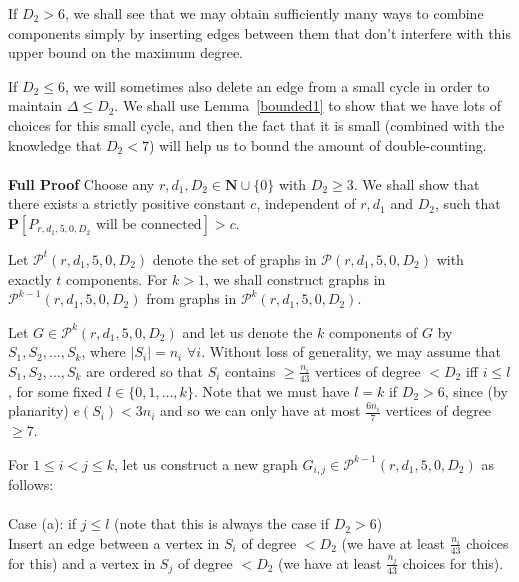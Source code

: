\documentclass{article}
\newtheorem{Proof of Theorem}{Proof of Theorem}
\begin{document}
If $D_{2} > 6$,
we shall see that we may obtain sufficiently many ways to combine components
simply by inserting edges between them that don't interfere with this upper bound on the maximum degree.


If $D_{2} \leq 6$,
we will sometimes also delete an edge from a small cycle
in order to maintain $\Delta \leq D_{2}$.
We shall use Lemma~\ref{bounded1} to show that
we have lots of choices for this small cycle,
and then the fact that it is small
(combined with the knowledge that $D_{2}<7$) 
will help us to bound the amount of double-counting. \\
\\
\textbf{Full Proof}
Choose any $r,d_{1},D_{2} \in \mathbf{N} \cup \{ 0 \}$ with $D_{2} \geq 3$.
We shall show that there exists a strictly positive constant $c$,
independent of $r,d_{1}$ and $D_{2}$,
such that
$\mathbf{P} [P_{r,d_{1},5,0,D_{2}} \textrm{ will be connected}] > c$.

Let $\mathcal{P}^{t}(r,d_{1},5,0,D_{2})$ denote the set of graphs in 
$\mathcal{P}(r,d_{1}, 5,0,D_{2})$ with exactly $t$ components.
For $k>1$, we shall construct graphs in $\mathcal{P}^{k-1}(r,d_{1},5,0,D_{2})$
from graphs in $\mathcal{P}^{k}(r,d_{1},5,0,D_{2})$.

Let $G \in \mathcal{P}^{k}(r,d_{1},5,0,D_{2})$
and let us denote the $k$ components of $G$ by $S_{1}, S_{2}, \ldots, S_{k}$,
where $|S_{i}|=n_{i}$ $\forall i$.
Without loss of generality,
we may assume that $S_{1}, S_{2}, \ldots, S_{k}$ are ordered so that 
$S_{i}$ contains $\geq \frac{n_{i}}{43}$ vertices of degree $<D_{2}$ iff $i \leq l$, 
for some fixed $l \in \{ 0,1, \ldots, k \}$.
Note that we must have $l=k$ if $D_{2} > 6$,
since (by planarity) $e(S_{i}) < 3n_{i}$
and so we can only have at most $\frac{6n_{i}}{7}$ vertices of degree~$\geq 7$.

For $1 \leq i < j \leq k$,
let us construct a new graph $G_{i,j} \in \mathcal{P}^{k-1}(r,d_{1},5,0,D_{2})$ as follows: \\
\\
Case (a): if $j \leq l$ (note that this is always the case if $D_{2} > 6$) \\
Insert an edge between a vertex in $S_{i}$ of degree $<D_{2}$
(we have at least $\frac{n_{i}}{43}$ choices for this)
and a vertex in $S_{j}$ of degree $<D_{2}$
(we have at least $\frac{n_{j}}{43}$ choices for this). 
\end{document}
